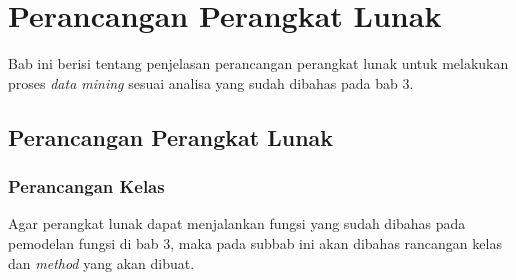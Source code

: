 \chapter{Perancangan Perangkat Lunak}

Bab ini berisi tentang penjelasan perancangan perangkat lunak untuk melakukan proses \textsl{data mining} sesuai analisa yang sudah dibahas pada bab 3.

\section{Perancangan Perangkat Lunak}

\subsection{Perancangan Kelas}
Agar perangkat lunak dapat menjalankan fungsi yang sudah dibahas pada pemodelan fungsi di bab 3, maka pada subbab ini akan dibahas rancangan kelas dan \textsl{method} yang akan dibuat.

